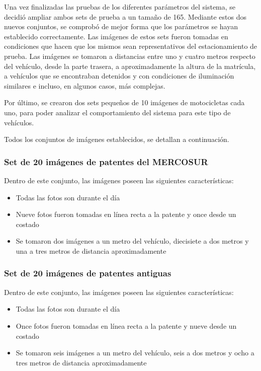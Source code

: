 Una vez finalizadas las pruebas de los diferentes parámetros del sistema, se decidió ampliar ambos sets de prueba a un tamaño de 165. Mediante estos dos nuevos conjuntos, se comprobó de mejor forma que los parámetros se hayan establecido correctamente. Las imágenes de estos sets fueron tomadas en condiciones que hacen que los mismos sean representativos del estacionamiento de prueba. Las imágenes se tomaron a distancias entre uno y cuatro metros respecto del vehículo, desde la parte trasera, a aproximadamente la altura de la matrícula, a vehículos que se encontraban detenidos y con condiciones de iluminación similares e incluso, en algunos casos, más complejas.

Por último, se crearon dos sets pequeños de 10 imágenes de motocicletas cada uno, para poder analizar el comportamiento del sistema para este tipo de vehículos.

Todos los conjuntos de imágenes establecidos, se detallan a continuación.

\subsubsection{Set de 20 imágenes de patentes del MERCOSUR}
Dentro de este conjunto, las imágenes poseen las siguientes características:
\begin{itemize}
	\item Todas las fotos son durante el día
	\item Nueve fotos fueron tomadas en línea recta a la patente y once desde un costado
	\item Se tomaron dos imágenes a un metro del vehículo, diecisiete a dos metros y una a tres metros de distancia aproximadamente
\end{itemize}

\subsubsection{Set de 20 imágenes de patentes antiguas}
Dentro de este conjunto, las imágenes poseen las siguientes características:
\begin{itemize}
	\item Todas las fotos son durante el día
	\item Once fotos fueron tomadas en línea recta a la patente y nueve desde un costado
	\item Se tomaron seis imágenes a un metro del vehículo, seis a dos metros y ocho a tres metros de distancia aproximadamente
\end{itemize}


